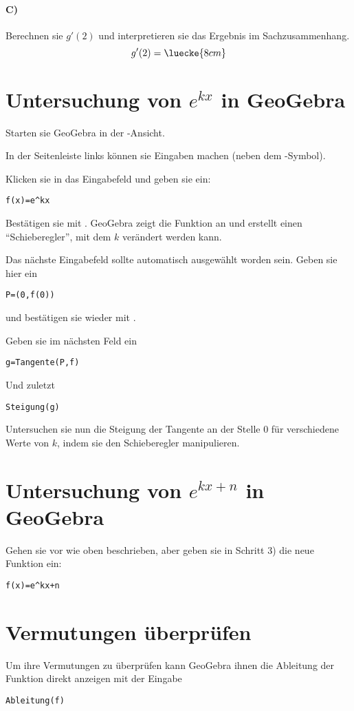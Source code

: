 \documentclass[10pt, a4paper]{scrartcl}
\renewcommand{\qrhinweis}[1]{%
	\begin{wrapfigure}{r}{0pt}
		\qrcode[height=1cm]{#1}
	\end{wrapfigure}%
}
\begin{document}
	\qrhinweis{g'(2) = 153,39}
	\paragraph{C)} Berechnen sie $g'(2)$ und interpretieren sie das Ergebnis im Sachzusammenhang.
	\[ g'(2) = \luecke{8cm} \]
	
	\clearpage
	
	\section*{Untersuchung von $e^{kx}$ in GeoGebra}
	\begin{enumeraten}
		\item Starten sie GeoGebra in der -Ansicht.
		\item In der Seitenleiste links können sie Eingaben machen (neben dem \appfunktion{+}-Symbol).
		\item Klicken sie in das Eingabefeld und geben sie ein:
		\begin{center}\large
			\verb!f(x)=e^kx!
		\end{center}
		\item Bestätigen sie mit . GeoGebra zeigt die Funktion an und erstellt einen \enquote{Schieberegler}, mit dem $k$ verändert werden kann.
		\item Das nächste Eingabefeld sollte automatisch ausgewählt worden sein. Geben sie hier ein
		\begin{center}\large
			\verb!P=(0,f(0))!
		\end{center}
		und bestätigen sie wieder mit .
		\item Geben sie im nächsten Feld ein
		\begin{center}\large
			\verb!g=Tangente(P,f)!
		\end{center}
		\item Und zuletzt
		\begin{center}\large
			\verb!Steigung(g)!
		\end{center}
		\item Untersuchen sie nun die Steigung der Tangente an der Stelle \num{0} für verschiedene Werte von $k$, indem sie den Schieberegler manipulieren.
	\end{enumeraten}

	\section*{Untersuchung von $e^{kx+n}$ in GeoGebra}
	Gehen sie vor wie oben beschrieben, aber geben sie in Schritt 3) die neue Funktion ein:
	\begin{center}\large
		\verb!f(x)=e^kx+n!
	\end{center}


	\section*{Vermutungen überprüfen}
	\textbf{\llap{\Large\symInfo}\space}Um ihre Vermutungen zu überprüfen kann GeoGebra ihnen die Ableitung der Funktion direkt anzeigen mit der Eingabe
	\begin{center}\large
			\verb!Ableitung(f)!
	\end{center}
\end{document}

